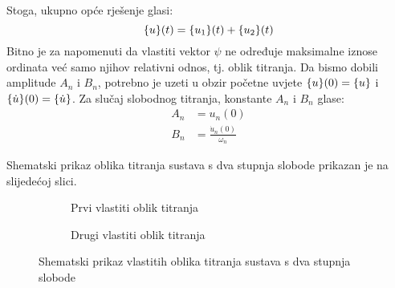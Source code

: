 Stoga, ukupno opće rješenje glasi:
\begin{equation}\label{eq:ukupno_opce_rjesenje_2dof}
    \vtor{u}{}(t)=\vtor{u_1}{}(t)+\vtor{u_2}{}(t)
\end{equation}
\newpage
Bitno je za napomenuti da vlastiti vektor $\psi$ ne određuje maksimalne iznose
ordinata već samo njihov relativni odnos, tj. oblik titranja. Da
bismo dobili amplitude $A_n$ i $B_n$, potrebno je uzeti u obzir početne uvjete  
$\vtor{u}{}(0) = \vtor{u}{}$ i $\vtor{u}{.}(0)=\vtor{u}{.}$. Za slučaj slobodnog titranja,
konstante $A_n$ i $B_n$ glase:
\begin{align}
    A_n&=u_n(0)\\
    B_n&=\frac{\dot{u}_n(0)}{\omega_n}
\end{align}

Shematski prikaz oblika titranja sustava s dva stupnja slobode prikazan je na slijedećoj
slici.
\begin{figure}[H]
    \centering
    \begin{subfigure}[b]{0.4\textwidth}
        \centering
        
        \caption{Prvi vlastiti oblik titranja}
    \end{subfigure}
    \begin{subfigure}[b]{0.4\textwidth}
        \centering
        
        \caption{Drugi vlastiti oblik titranja}
    \end{subfigure}
    \caption{Shematski prikaz vlastitih oblika titranja sustava s dva stupnja slobode}
\end{figure}
